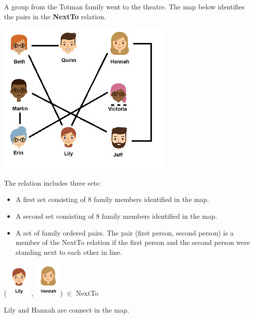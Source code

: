 \documentclass{ximera}
\begin{document}
\begin{definition}
  A group from the Totman family went to the theatre. The map below identifies the pairs in the \textbf{NextTo} relation.
  
  

    \includegraphics[width=321px,height=285px]{pics/standinline.png}

  
 

  The  relation includes three sets:
    \begin{itemize}
    \item A first set consisting of 8 family members identified in the map.
    \item A second set consisting of 8 family members identified in the map.
    \item A set of family ordered pairs. The pair (first person, second person) is a member of the NextTo relation if the first person and the second person were standing next to each other in line.
    \end{itemize}

  
\end{definition}



\begin{exercise}
 ({\includegraphics[width=50px,height=65px]{pics/people/lily.png}}, {\includegraphics[width=50px,height=65px]{pics/people/hannah.png}}) $\in$ NextTo 

  \begin{multipleChoice}
  \end{multipleChoice}
  \begin{feedback}
Lily and Hannah are connect in the map.
  \end{feedback}
\end{exercise}
\end{document}
